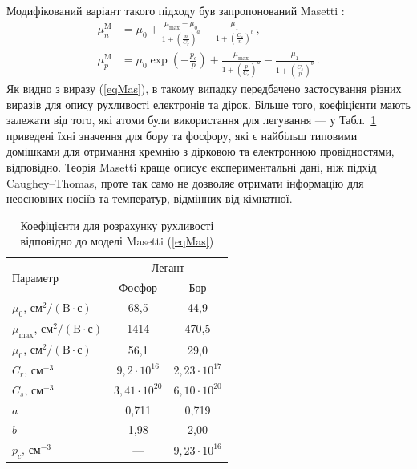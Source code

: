\documentclass[12pt,a4paper,titlepage,oneside]{book}
\numberwithin{equation}{part}
\begin{document}
Модифікований варіант такого підходу був запропонований Masetti \cite{Masetti1983}:
\begin{equation}\label{eqMas}
\begin{aligned}
    \mu_n^\mathrm{M} &=\mu_0+\frac{\mu_\mathrm{max}-\mu_0}{1+\left(\frac{n}{C_r}\right)^a}-\frac{\mu_1}{1+\left(\frac{C_s}{n}\right)^b}\,, \\
   \mu_p^\mathrm{M} &=\mu_0\exp\left(-\frac{p_c}{p}\right)+\frac{\mu_\mathrm{max}}{1+\left(\frac{p}{C_r}\right)^a}-\frac{\mu_1}{1+\left(\frac{C_s}{p}\right)^b}\,.
\end{aligned}
\end{equation}
Як видно з виразу (\ref{eqMas}), в такому випадку передбачено застосування різних виразів для опису рухливості електронів та дірок.
Більше того, коефіцієнти мають залежати від того, які атоми були використання для легування --- у Табл.~\ref{tblMas} приведені
їхні значення для бору та фосфору, які є найбільш типовими домішками для отримання кремнію з дірковою та електронною провідностями, відповідно.
Теорія Masetti краще описує експериментальні дані, ніж підхід  Caughey--Thomas, проте так само не дозволяє отримати інформацію для неосновних носіїв та
температур, відмінних від кімнатної.

\begin{table}
\caption{Коефіцієнти для розрахунку рухливості відповідно до моделі Masetti (\ref{eqMas})}
\label{tblMas}
\centering
\begin{tabular}{|l|c|c|}
\hline
\multirow{2}{*}{Параметр} & \multicolumn{2}{c|}{Легант} \\
\cline{2-3}
&Фосфор&Бор\\
\hline
$\mu_0$, $\text{см}^2/(\text{B}\cdot\text{с})$&68,5&44,9\\
\hline
$\mu_\mathrm{max}$, $\text{см}^2/(\text{B}\cdot\text{с})$&1414&470,5\\
\hline
$\mu_0$, $\text{см}^2/(\text{B}\cdot\text{с})$&56,1&29,0\\
\hline
$C_r$, см$^{-3}$&$9,2\cdot10^{16}$&$2,23\cdot10^{17}$\\
\hline
$C_s$, см$^{-3}$&$3,41\cdot10^{20}$&$6,10\cdot10^{20}$\\
\hline
$a$&0,711&0,719\\
\hline
$b$&1,98&2,00\\
\hline
$p_c$, см$^{-3}$&---&$9,23\cdot10^{16}$\\
\hline
\end{tabular}
\end{table}
\end{document}
